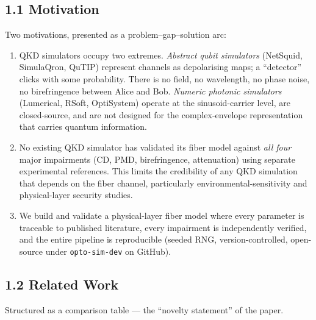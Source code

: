 \documentclass[11pt,a4paper]{article}
\begin{document}
\subsection{1.1 Motivation}
Two motivations, presented as a problem--gap--solution arc:

\begin{enumerate}[leftmargin=2em]
  \item[\textbf{Problem.}] QKD simulators occupy two extremes.
    \emph{Abstract qubit simulators} (NetSquid, SimulaQron, QuTIP)
    represent channels as depolarising maps; a \enquote{detector} clicks
    with some probability.  There is no field, no wavelength, no phase
    noise, no birefringence between Alice and Bob.  \emph{Numeric
    photonic simulators} (Lumerical, RSoft, OptiSystem) operate at the
    sinusoid-carrier level, are closed-source, and are not designed for
    the complex-envelope representation that carries quantum information.

  \item[\textbf{Gap.}] No existing QKD simulator has validated its fiber
    model against \emph{all four} major impairments (CD, PMD,
    birefringence, attenuation) using separate experimental references.
    This limits the credibility of any QKD simulation that depends on the
    fiber channel, particularly environmental-sensitivity and
    physical-layer security studies.

  \item[\textbf{Solution.}] We build and validate a physical-layer fiber
    model where every parameter is traceable to published literature,
    every impairment is independently verified, and the entire pipeline
    is reproducible (seeded RNG, version-controlled, open-source under
    \texttt{opto-sim-dev} on GitHub).
\end{enumerate}

\subsection{1.2 Related Work}
Structured as a comparison table --- the \enquote{novelty statement} of the paper.
\end{document}
